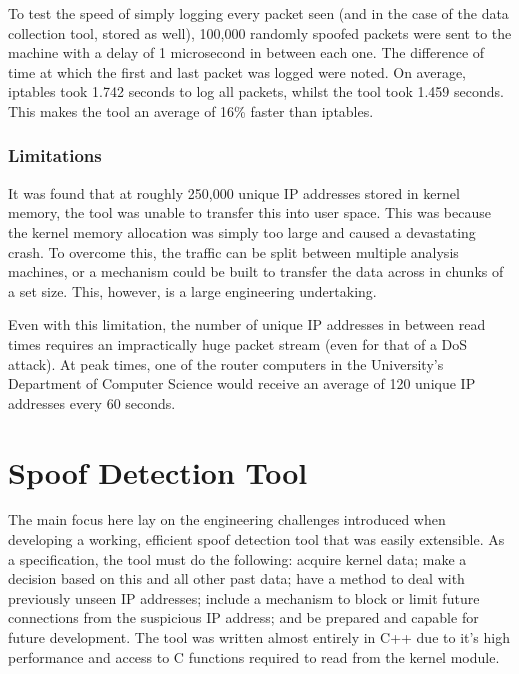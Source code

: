 \documentclass[12pt,twoside]{article}
\begin{document}
To test the speed of simply logging every packet seen (and in the case of the data collection tool, stored as well), 100,000 randomly spoofed packets were sent to the machine with a delay of 1 microsecond in between each one. The difference of time at which the first and last packet was logged were noted. On average, iptables took 1.742 seconds to log all packets, whilst the tool took 1.459 seconds. This makes the tool an average of 16\% faster than iptables.

\subsubsection{Limitations}
It was found that at roughly 250,000 unique IP addresses stored in kernel memory, the tool was unable to transfer this into user space. This was because the kernel memory allocation was simply too large and caused a devastating crash. To overcome this,  the traffic can be split between multiple analysis machines, or a mechanism could be built to transfer the data across in chunks of a set size. This, however, is a large engineering undertaking.

Even with this limitation, the number of unique IP addresses in between read times requires an impractically huge packet stream (even for that of a DoS attack). At peak times, one of the router computers in the University's Department of Computer Science would receive an average of 120 unique IP addresses every 60 seconds.


\section{Spoof Detection Tool} \label{analysis_tool}

The main focus here lay on the engineering challenges introduced when developing a working, efficient spoof detection tool that was easily extensible. As a specification, the tool must do the following: acquire kernel data; make a decision based on this and all other past data; have a method to deal with previously unseen IP addresses; include a mechanism to block or limit future connections from the suspicious IP address; and be prepared and capable for future development. The tool was written almost entirely in C++ due to it's high performance and access to C functions required to read from the kernel module. 
\end{document}
